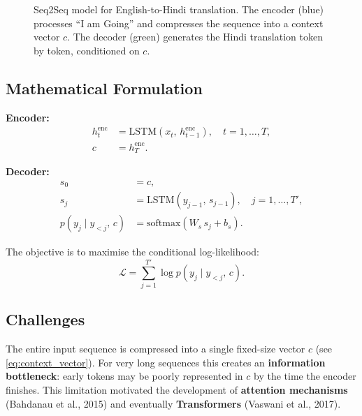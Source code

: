 \documentclass[12pt,a4paper]{article}
\begin{document}
\begin{figure}[htbp]
\caption{Seq2Seq model for English-to-Hindi translation. The encoder (blue) processes
``I am Going'' and compresses the sequence into a context vector $c$. The decoder (green)
generates the Hindi translation token by token, conditioned on $c$.}
\label{fig:seq2seq}
\end{figure}

\subsection{Mathematical Formulation}

\textbf{Encoder:}
\begin{align}
  h_t^{\text{enc}} &= \text{LSTM}(x_t,\, h_{t-1}^{\text{enc}}), \quad t = 1,\ldots,T, \\
  c &= h_T^{\text{enc}}.
  \label{eq:context_vector}
\end{align}

\textbf{Decoder:}
\begin{align}
  s_0 &= c, \\
  s_j &= \text{LSTM}(y_{j-1},\, s_{j-1}), \quad j = 1,\ldots,T', \\
  p(y_j \mid y_{<j},\, c) &= \text{softmax}(W_s\, s_j + b_s).
\end{align}

The objective is to maximise the conditional log-likelihood:
\begin{equation}
  \mathcal{L} = \sum_{j=1}^{T'} \log p(y_j \mid y_{<j},\, c).
  \label{eq:seq2seq_loss}
\end{equation}

\subsection{Challenges}

\begin{warningbox}[title=Fixed-Size Context Vector Bottleneck]
The entire input sequence is compressed into a single fixed-size vector $c$
(see \cref{eq:context_vector}). For very long sequences this creates an
\textbf{information bottleneck}: early tokens may be poorly represented in $c$
by the time the encoder finishes. This limitation motivated the development of
\textbf{attention mechanisms} (Bahdanau et al., 2015) and eventually
\textbf{Transformers} (Vaswani et al., 2017).
\end{warningbox}
\end{document}
